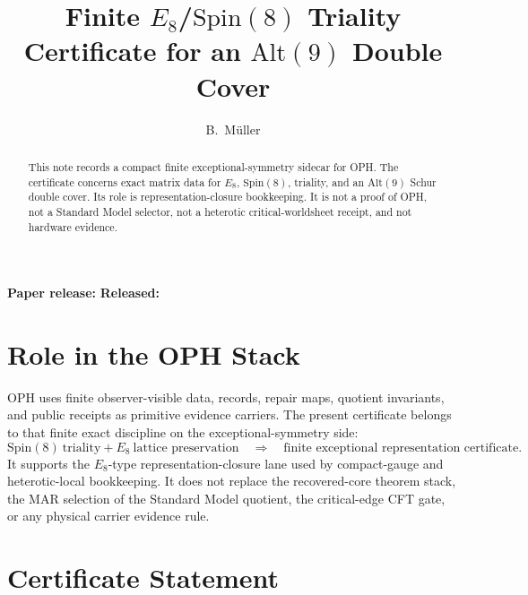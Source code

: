 \documentclass[11pt]{article}
\title{Finite \(E_8\)/\(\mathrm{Spin}(8)\) Triality Certificate for an \(\mathrm{Alt}(9)\) Double Cover}
\author{B.\ M\"uller}
\date{\OPHPaperReleaseDate}
\theoremstyle{remark}
\theoremstyle{plain}
\begin{document}
\maketitle
\begin{center}
\small\textbf{Paper release:} \OPHPaperReleaseID\quad
\textbf{Released:} \OPHPaperReleaseDate
\end{center}

\begin{abstract}
This note records a compact finite exceptional-symmetry sidecar for OPH. The certificate concerns
exact matrix data for \(E_8\), \(\mathrm{Spin}(8)\), triality, and an
\(\mathrm{Alt}(9)\) Schur double cover. Its role is representation-closure bookkeeping. It is not a
proof of OPH, not a Standard Model selector, not a heterotic critical-worldsheet receipt, and not
hardware evidence.
\end{abstract}

\section{Role in the OPH Stack}

OPH uses finite observer-visible data, records, repair maps, quotient invariants, and public
receipts as primitive evidence carriers. The present certificate belongs to that finite exact
discipline on the exceptional-symmetry side:
\[
\mathrm{Spin}(8)\ \text{triality} + E_8\ \text{lattice preservation}
\quad\Rightarrow\quad
\text{finite exceptional representation certificate}.
\]
It supports the \(E_8\)-type representation-closure lane used by compact-gauge and heterotic-local
bookkeeping. It does not replace the recovered-core theorem stack, the MAR selection of the
Standard Model quotient, the critical-edge CFT gate, or any physical carrier evidence rule.

\section{Certificate Statement}
\end{document}
